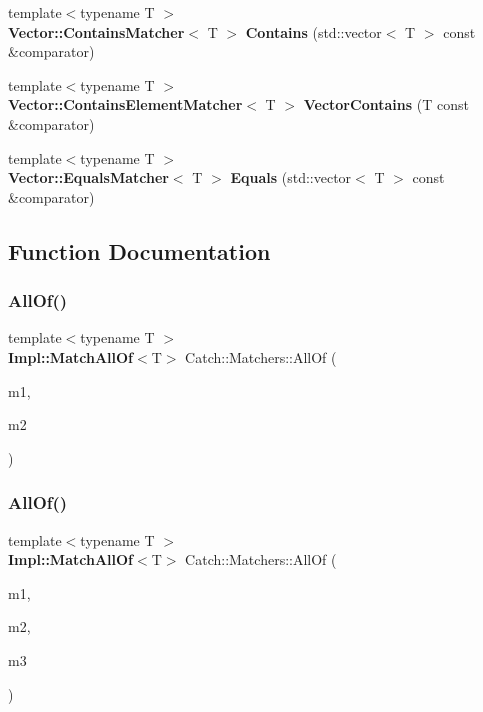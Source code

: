 \begin{DoxyCompactItemize}
{\footnotesize template$<$typename T $>$ }\\\textbf{ Vector\+::\+Contains\+Matcher}$<$ T $>$ \textbf{ Contains} (std\+::vector$<$ T $>$ const \&comparator)
\item 
{\footnotesize template$<$typename T $>$ }\\\textbf{ Vector\+::\+Contains\+Element\+Matcher}$<$ T $>$ \textbf{ Vector\+Contains} (T const \&comparator)
\item 
{\footnotesize template$<$typename T $>$ }\\\textbf{ Vector\+::\+Equals\+Matcher}$<$ T $>$ \textbf{ Equals} (std\+::vector$<$ T $>$ const \&comparator)
\end{DoxyCompactItemize}


\subsection{Function Documentation}
\mbox{\label{namespace_catch_1_1_matchers_ac690851ef8a0a27206cd9cb10e3c2b18}} 
\subsubsection{All\+Of()\hspace{0.1cm}{\footnotesize\ttfamily [1/2]}}
{\footnotesize\ttfamily template$<$typename T $>$ \\
\textbf{ Impl\+::\+Match\+All\+Of}$<$T$>$ Catch\+::\+Matchers\+::\+All\+Of (\begin{DoxyParamCaption}\item[{\textbf{ Impl\+::\+Matcher\+Base}$<$ T $>$ const \&}]{m1,  }\item[{\textbf{ Impl\+::\+Matcher\+Base}$<$ T $>$ const \&}]{m2 }\end{DoxyParamCaption})\hspace{0.3cm}{\ttfamily [inline]}}

\mbox{\label{namespace_catch_1_1_matchers_a9cf3bef1efd3453f2528bb16d1ec5048}} 
\subsubsection{All\+Of()\hspace{0.1cm}{\footnotesize\ttfamily [2/2]}}
{\footnotesize\ttfamily template$<$typename T $>$ \\
\textbf{ Impl\+::\+Match\+All\+Of}$<$T$>$ Catch\+::\+Matchers\+::\+All\+Of (\begin{DoxyParamCaption}\item[{\textbf{ Impl\+::\+Matcher\+Base}$<$ T $>$ const \&}]{m1,  }\item[{\textbf{ Impl\+::\+Matcher\+Base}$<$ T $>$ const \&}]{m2,  }\item[{\textbf{ Impl\+::\+Matcher\+Base}$<$ T $>$ const \&}]{m3 }\end{DoxyParamCaption})\hspace{0.3cm}{\ttfamily [inline]}}

